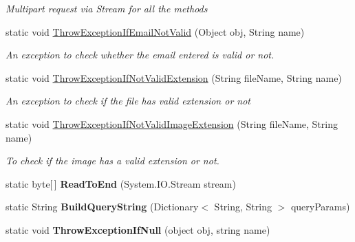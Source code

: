 \begin{DoxyCompactItemize}
\begin{DoxyCompactList}\small\item\em Multipart request via Stream for all the methods \end{DoxyCompactList}\item 
static void \hyperlink{classcom_1_1shephertz_1_1app42_1_1paas_1_1sdk_1_1csharp_1_1util_1_1_util_a6ea29065db0b48b1590a408d03323561}{Throw\+Exception\+If\+Email\+Not\+Valid} (Object obj, String name)
\begin{DoxyCompactList}\small\item\em An exception to check whether the email entered is valid or not. \end{DoxyCompactList}\item 
static void \hyperlink{classcom_1_1shephertz_1_1app42_1_1paas_1_1sdk_1_1csharp_1_1util_1_1_util_a28c41e9017db6a5dd163be3fc3122fd3}{Throw\+Exception\+If\+Not\+Valid\+Extension} (String file\+Name, String name)
\begin{DoxyCompactList}\small\item\em An exception to check if the file has valid extension or not \end{DoxyCompactList}\item 
static void \hyperlink{classcom_1_1shephertz_1_1app42_1_1paas_1_1sdk_1_1csharp_1_1util_1_1_util_a6021b3e8ac131dff48c525ec5c8f278f}{Throw\+Exception\+If\+Not\+Valid\+Image\+Extension} (String file\+Name, String name)
\begin{DoxyCompactList}\small\item\em To check if the image has a valid extension or not. \end{DoxyCompactList}\item 
\hypertarget{classcom_1_1shephertz_1_1app42_1_1paas_1_1sdk_1_1csharp_1_1util_1_1_util_a65e3cba9c6e8c388e0fe7e9dbd2a0d59}{static byte\mbox{[}$\,$\mbox{]} {\bfseries Read\+To\+End} (System.\+I\+O.\+Stream stream)}\label{classcom_1_1shephertz_1_1app42_1_1paas_1_1sdk_1_1csharp_1_1util_1_1_util_a65e3cba9c6e8c388e0fe7e9dbd2a0d59}

\item 
\hypertarget{classcom_1_1shephertz_1_1app42_1_1paas_1_1sdk_1_1csharp_1_1util_1_1_util_ad4ff86883fb671951af758bed1aecddb}{static String {\bfseries Build\+Query\+String} (Dictionary$<$ String, String $>$ query\+Params)}\label{classcom_1_1shephertz_1_1app42_1_1paas_1_1sdk_1_1csharp_1_1util_1_1_util_ad4ff86883fb671951af758bed1aecddb}

\item 
\hypertarget{classcom_1_1shephertz_1_1app42_1_1paas_1_1sdk_1_1csharp_1_1util_1_1_util_a74ba9227ec104b5c9dd0db508041c6db}{static void {\bfseries Throw\+Exception\+If\+Null} (object obj, string name)}\label{classcom_1_1shephertz_1_1app42_1_1paas_1_1sdk_1_1csharp_1_1util_1_1_util_a74ba9227ec104b5c9dd0db508041c6db}

\end{DoxyCompactItemize}


